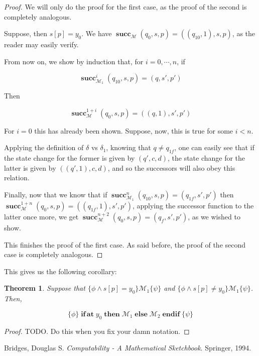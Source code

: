 \documentclass{article}
\newtheorem{theorem}{Theorem}
\newcommand{\M}{\mathcal{M}}
\DeclareMathOperator{\suc}{\mathbf{succ}}
\DeclareMathOperator{\Nifat}{\mathbf{if\,at}}
\DeclareMathOperator{\Nthen}{\mathbf{then}}
\DeclareMathOperator{\Nelse}{\mathbf{else}}
\DeclareMathOperator{\Nendif}{\mathbf{endif}}
\begin{document}
	\begin{proof}
	We will only do the proof for the first case, as the proof of the second is completely analogous.
	
	Suppose, then $s[p] = y_0$. We have $\suc_\M (q_0, s, p) = ((q_{10}, 1), s, p)$, as the reader may easily verify.
	
	From now on, we show by induction that, for $i = 0, \cdots, n$, if
	
	\[\suc^i_{\M_1} (q_{10}, s, p) = (q, s', p')\]
	
	Then
	
	\[\suc^{1+i}_\M (q_0, s, p) = ((q, 1), s', p')\]
	
	For $i = 0$ this has already been shown. Suppose, now, this is true for some $i < n$.
	
	Applying the definition of $\delta$ vs $\delta_1$, knowing that $q \neq q_{1f}$, one can easily see that if the state change for the former is given by $(q', c, d)$, the state change for the latter is given by $((q', 1), c, d)$, and so the successors will also obey this relation.
	
	Finally, now that we know that if $\suc^n_{\M_1} (q_{10}, s, p) = (q_{1f}, s', p')$ then $\suc^{1+n}_\M (q_0, s, p) = ((q_{1f}, 1), s', p')$, applying the successor function to the latter once more, we get $\suc^{n+2}_\M (q_0, s, p) = (q_f, s', p')$, as we wished to show.
	
	This finishes the proof of the first case. As said before, the proof of the second case is completely analogous.
	\end{proof}
	
	This gives us the following corollary:
	
	\begin{theorem}
	Suppose that $\{\phi \land s[p] = y_0\} \M_1 \{\psi\}$ and $\{\phi \land s[p] \neq y_0\} \M_1 \{\psi\}$. Then,
	
	\[\{\phi\} \Nifat y_0 \Nthen \M_1 \Nelse \M_2 \Nendif \{\psi\}\]
	\end{theorem}
	
	\begin{proof}
	TODO. Do this when you fix your damn notation.
	\end{proof}

	
\begin{thebibliography}{9}
Bridges, Douglas S.
\textit{Computability - A Mathematical Sketchbook}. 
Springer, 1994. %
\end{thebibliography}	
\end{document}

